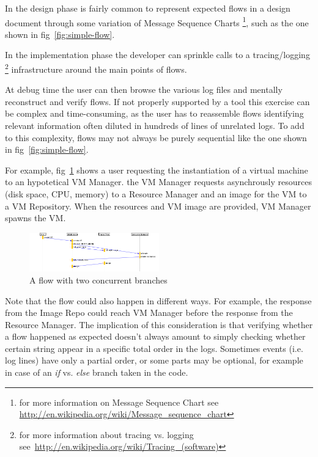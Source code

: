 \documentclass[11pt, twoside, titlepage]{book}
\begin{document}
In the design phase is fairly common to represent expected flows in a design
document through some variation of Message Sequence Charts
\footnote{for more information on Message Sequence Chart see~
\href{http://en.wikipedia.org/wiki/Message\_sequence\_chart}
{http://en.wikipedia.org/wiki/Message\_sequence\_chart}}, such as the one shown
in fig~\ref{fig:simple-flow}.

In the implementation phase the developer can sprinkle calls to a
tracing/logging \footnote{ for more information about tracing vs.
logging
see~\href{http://en.wikipedia.org/wiki/Tracing\_(software)}
{http://en.wikipedia.org/wiki/Tracing\_(software)}} infrastructure
around the main points of flows.
  
At debug time
the user can then browse the various log files and mentally reconstruct and
verify flows. If not properly supported by a tool this exercise can be complex
and time-consuming, as the user has to reassemble flows identifying relevant
information often diluted in hundreds of lines of unrelated logs. To add to this
complexity, flows may not always be purely sequential like the one shown in
fig~\ref{fig:simple-flow}. 

For example, fig~\ref{fig:concurrent-flow} shows a user requesting the
instantiation of a virtual machine to an hypotetical VM Manager. the VM Manager
requests asynchrously resources (disk space, CPU, memory) to a Resource Manager
and an image for the VM to a VM Repository. When the resources and VM image are
provided, VM Manager spawns the VM.

\begin{figure}[ht!]
  \centering
  \includegraphics[width=0.5\textwidth,natwidth=1024,natheight=600]{concurrent-flow.png}
  \caption{A flow with two concurrent branches}
  \label{fig:concurrent-flow} 
\end{figure}  

Note that the flow could also happen in different ways. For example, 
the response from the Image Repo could reach VM Manager before the response from
the Resource Manager. The implication of this consideration is that verifying
whether a flow happened as expected doesn't always amount to simply checking
whether certain string appear in a specific total order in the logs. Sometimes
events (i.e. log lines) have only a partial order, or some parts may be
optional, for example in case of an \textit{if} vs. \textit{else} branch taken 
in the code.
\end{document}
